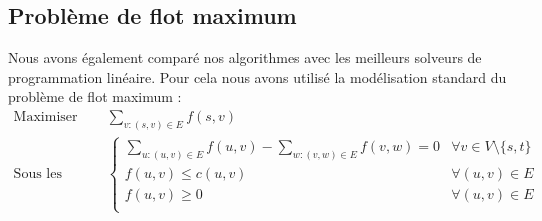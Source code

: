 \documentclass[a4paper]{article}
\begin{document}
\subsection{Problème de flot maximum}
Nous avons également comparé nos algorithmes avec les meilleurs solveurs de programmation linéaire. Pour cela nous avons utilisé la modélisation standard du problème de flot maximum :
\[
		\begin{aligned}
			\text{Maximiser} \quad &\sum_{v:(s, v)\in E} f(s, v) \\
			\text{Sous les contraintes} \quad
			&
			 \begin{cases}
				\displaystyle\sum_{u:(u, v)\in E}{f(u, v)} - \sum_{w:(v, w)\in E}{f(v, w)} = 0 & \forall v \in V \setminus \{s, t\} \\
				f(u, v) \leq c(u, v) & \forall (u, v) \in E \\
				f(u, v) \geq 0 & \forall (u, v) \in E \\
			\end{cases}
		\end{aligned}
\]
\end{document}
